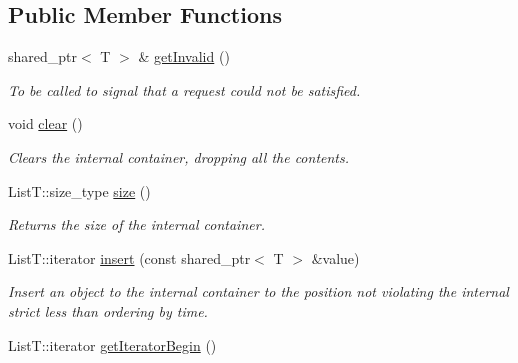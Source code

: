 \subsection*{Public Member Functions}
\begin{DoxyCompactItemize}
\item 
shared\-\_\-ptr$<$ T $>$ \& \hyperlink{classmsf__core_1_1SortedContainer_a9c72942ce59c634559fe7e226b6ab302}{get\-Invalid} ()
\begin{DoxyCompactList}\small\item\em To be called to signal that a request could not be satisfied. \end{DoxyCompactList}\item 
\hypertarget{classmsf__core_1_1SortedContainer_aea65ad1ff460ab46445b433ea3db49b1}{void \hyperlink{classmsf__core_1_1SortedContainer_aea65ad1ff460ab46445b433ea3db49b1}{clear} ()}\label{classmsf__core_1_1SortedContainer_aea65ad1ff460ab46445b433ea3db49b1}

\begin{DoxyCompactList}\small\item\em Clears the internal container, dropping all the contents. \end{DoxyCompactList}\item 
List\-T\-::size\-\_\-type \hyperlink{classmsf__core_1_1SortedContainer_af51c989973b49002e737190cec67b6b4}{size} ()
\begin{DoxyCompactList}\small\item\em Returns the size of the internal container. \end{DoxyCompactList}\item 
\hypertarget{classmsf__core_1_1SortedContainer_a8e6ef89431cbcac53439b580a7b8706c}{List\-T\-::iterator \hyperlink{classmsf__core_1_1SortedContainer_a8e6ef89431cbcac53439b580a7b8706c}{insert} (const shared\-\_\-ptr$<$ T $>$ \&value)}\label{classmsf__core_1_1SortedContainer_a8e6ef89431cbcac53439b580a7b8706c}

\begin{DoxyCompactList}\small\item\em Insert an object to the internal container to the position not violating the internal strict less than ordering by time. \end{DoxyCompactList}\item 
\hypertarget{classmsf__core_1_1SortedContainer_a66c37f04293ec2b3e2fae69ff2ac498e}{List\-T\-::iterator \hyperlink{classmsf__core_1_1SortedContainer_a66c37f04293ec2b3e2fae69ff2ac498e}{get\-Iterator\-Begin} ()}\label{classmsf__core_1_1SortedContainer_a66c37f04293ec2b3e2fae69ff2ac498e}


\end{DoxyCompactItemize}
